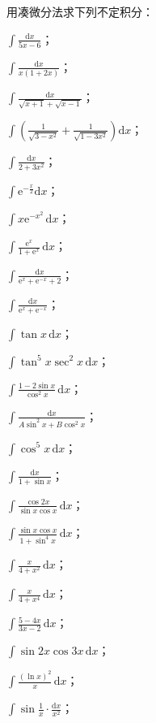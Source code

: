 \begin{xiti}
\item 用凑微分法求下列不定积分：
\begin{ziti}
\item $\displaystyle\int\frac{\mathrm{d}x}{5x-6}$；
\item $\displaystyle\int\frac{\mathrm{d}x}{x(1+2x)}$；
\item $\displaystyle\int\frac{\mathrm{d}x}{\sqrt{x+1}+\sqrt{x-1}}$；
\item $\displaystyle\int\left(\frac{1}{\sqrt{3-x^{2}}}+\frac{1}{\sqrt{1-3x^{2}}}\right)\mathrm{d}x$；
\item $\displaystyle\int\frac{\mathrm{d}x}{2+3x^{2}}$；
\item $\displaystyle\int\mathrm{e}^{-\frac{x}{2}}\mathrm{d}x$；
\item $\displaystyle\int x\mathrm{e}^{-x^{2}}\,\mathrm{d}x$；
\item $\displaystyle\int\frac{\mathrm{e}^{x}}{1+\mathrm{e}^{x}}\,\mathrm{d}x$；
\item $\displaystyle\int\frac{\mathrm{d}x}{\mathrm{e}^{x}+\mathrm{e}^{-x}+2}$；
\item $\displaystyle\int\frac{\mathrm{d}x}{\mathrm{e}^{x}+\mathrm{e}^{-x}}$；
\item $\displaystyle\int\tan x\,\mathrm{d}x$；
\item $\displaystyle\int\tan^{5}x\sec^{2}x\,\mathrm{d}x$；
\item $\displaystyle\int\frac{1-2\sin x}{\cos^{2}x}\,\mathrm{d}x$；
\item $\displaystyle\int\frac{\mathrm{d}x}{A\sin^{2}x+B\cos^{2}x}$；
\item $\displaystyle\int\cos^{5}x\,\mathrm{d}x$；
\item $\displaystyle\int\frac{\mathrm{d}x}{1+\sin x}$；
\item $\displaystyle\int\frac{\cos 2x}{\sin x\cos x}\,\mathrm{d}x$；
\item $\displaystyle\int\frac{\sin x\cos x}{1+\sin^{4}x}\,\mathrm{d}x$；
\item $\displaystyle\int\frac{x}{4+x^{2}}\,\mathrm{d}x$；
\item $\displaystyle\int\frac{x}{4+x^{4}}\,\mathrm{d}x$；
\item $\displaystyle\int\frac{5-4x}{3x-2}\,\mathrm{d}x$；
\item $\displaystyle\int\sin 2x\cos 3x\,\mathrm{d}x$；
\item $\displaystyle\int\frac{(\ln x)^{2}}{x}\,\mathrm{d}x$；
\item $\displaystyle\int\sin\frac{1}{x}\cdot\frac{\mathrm{d}x}{x^{2}}$；

\end{ziti}
\end{xiti}
